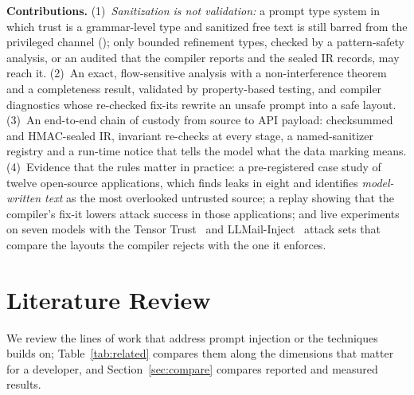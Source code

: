 \documentclass[conference]{IEEEtran}
\begin{document}
\textbf{Contributions.}
(1)~\emph{Sanitization is not validation:} a prompt type system in which trust is a grammar-level type and sanitized free text is still barred from the privileged channel (); only bounded refinement types, checked by a pattern-safety analysis, or an audited  that the compiler reports and the sealed IR records, may reach it.
(2)~An exact, flow-sensitive analysis with a non-interference theorem and a completeness result, validated by property-based testing, and compiler diagnostics whose re-checked fix-its rewrite an unsafe prompt into a safe layout.
(3)~An end-to-end chain of custody from source to API payload: checksummed and HMAC-sealed IR, invariant re-checks at every stage, a named-sanitizer registry and a run-time notice that tells the model what the data marking means.
(4)~Evidence that the rules matter in practice: a pre-registered case study of twelve open-source applications, which finds leaks in eight and identifies \emph{model-written text} as the most overlooked untrusted source; a replay showing that the compiler's fix-it lowers attack success in those applications; and live experiments on seven models with the Tensor Trust~\cite{toyer2024tensortrust} and LLMail-Inject~\cite{abdelnabi2025llmail} attack sets that compare the layouts the compiler rejects with the one it enforces.

\section{Literature Review}\label{sec:lit}

We review the lines of work that address prompt injection or the techniques \TL{} builds on; Table~\ref{tab:related} compares them along the dimensions that matter for a developer, and Section~\ref{sec:compare} compares reported and measured results.
\end{document}

